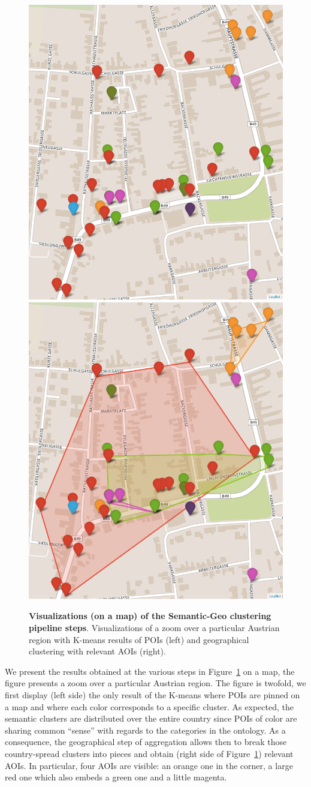 \begin{figure}
    \centering
    \includegraphics[width=.49\textwidth]{images/7_implemenation_and_usecases/kmean.png}
	\includegraphics[width=.49\textwidth]{images/7_implemenation_and_usecases/kmeandbscan.png}
    \caption{\textbf{Visualizations (on a map) of the Semantic-Geo clustering pipeline steps}.
    Visualizations of a zoom over a particular Austrian region with K-means results of POIs (left) and geographical clustering with relevant AOIs (right).}
    \label{fig:imp-use-cases-map}
\end{figure}

We present the results obtained at the various steps in Figure~\ref{fig:imp-use-cases-map} on a map, the figure presents a zoom over a particular Austrian region. 
The figure is twofold, we first display (left side) the only result of the K-means where \gls{POI}s are pinned on a map and where each color corresponds to a specific cluster. 
As expected, the semantic clusters are distributed over the entire country since \gls{POI}s of color are sharing common ``sense'' with regards to the categories in the ontology. 
As a consequence, the geographical step of aggregation allows then to break those country-spread clusters into pieces and obtain (right side of Figure~\ref{fig:imp-use-cases-map}) relevant \gls{AOI}s. 
In particular, four \gls{AOI}s are visible: an orange one in the corner, a large red one which also embeds a green one and a little magenta.


